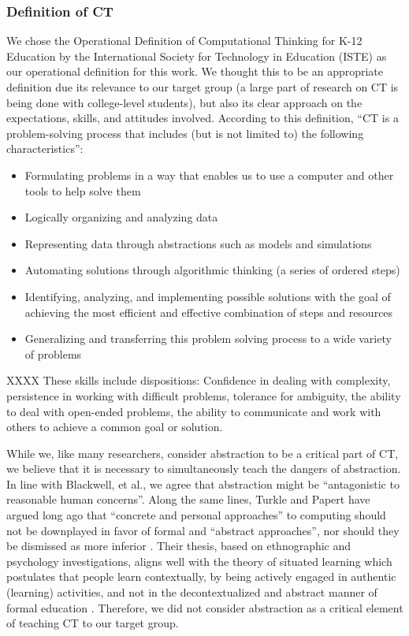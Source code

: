 \documentclass{acm_proc_article-sp}
\begin{document}
\subsubsection{Definition of CT}
We chose the Operational Definition of Computational Thinking for K-12 Education by the International Society for Technology in Education (ISTE) \cite{operationalct} as our operational definition for this work. 
We thought this to be an appropriate definition due its relevance to our target group (a large part of research on CT is being done with college-level students), but also its clear approach on the expectations, skills, and attitudes involved. 
According to this definition, ``CT is a problem-solving process that includes (but is not limited to) the following characteristics'': 
\begin{itemize}
  \item{Formulating problems in a way that enables us to use a computer and other tools to help solve them}
  \item{Logically organizing and analyzing data}
  \item{Representing data through abstractions such as models and simulations}
  \item{Automating solutions through algorithmic thinking (a series of ordered steps)}
  \item{Identifying, analyzing, and implementing possible solutions with the goal of achieving the most efficient and effective combination of steps and resources}
  \item{Generalizing and transferring this problem solving process to a wide variety of problems}
\end{itemize}

XXXX
These skills include dispositions:
Confidence in dealing with complexity, persistence in working with difficult problems, tolerance for ambiguity, the ability to deal with open-ended problems, the ability to communicate and work with others to achieve a common goal or solution.

While we, like many researchers, consider abstraction to be a critical part of CT, we believe that it is necessary to simultaneously teach the dangers of abstraction. 
In line with Blackwell, et al., we agree that abstraction might be ``antagonistic to reasonable human concerns''\cite{blackwell2008abstract}. 
Along the same lines, Turkle and Papert have argued long ago that ``concrete and personal approaches'' to computing should not be downplayed in favor of formal and ``abstract approaches'', nor should they be dismissed as more inferior \cite{turkle1990epistemological}. 
Their thesis, based on ethnographic and psychology investigations, aligns well with the theory of situated learning which postulates that people learn contextually, by being actively engaged in authentic (learning) activities, and not in the decontextualized and abstract manner of formal education \cite{brown1989situated}. 
Therefore, we did not consider abstraction as a critical element of teaching CT to our target group.
\end{document}
